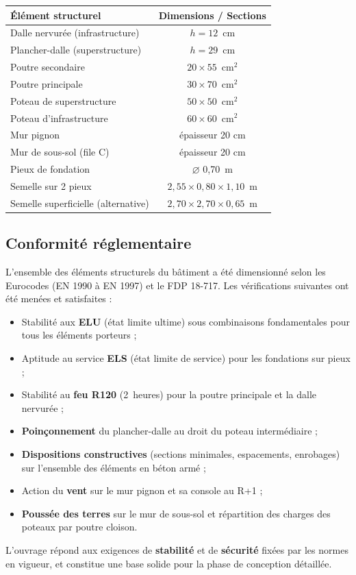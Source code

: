 \begin{tabularx}{\linewidth}{Xc}
\toprule
\textbf{Élément structurel} & \textbf{Dimensions / Sections} \\
\midrule
Dalle nervurée (infrastructure)             & $h = 12$~cm \\
Plancher-dalle (superstructure)             & $h = 29$~cm \\
Poutre secondaire                           & $20 \times 55$~cm$^{2}$ \\
Poutre principale                           & $30 \times 70$~cm$^{2}$ \\
Poteau de superstructure                    & $50 \times 50$~cm$^{2}$ \\
Poteau d'infrastructure                     & $60 \times 60$~cm$^{2}$ \\
Mur pignon                                  & épaisseur 20 cm \\
Mur de sous-sol (file C)                    & épaisseur 20 cm \\
Pieux de fondation                          & $\varnothing$ 0{,}70~m \\
Semelle sur 2 pieux                         & $2{,}55 \times 0{,}80 \times 1{,}10$~m \\
Semelle superficielle (alternative)         & $2{,}70 \times 2{,}70 \times 0{,}65$~m \\
\bottomrule
\end{tabularx}

\vspace{1cm}

\subsection*{Conformité réglementaire}

L'ensemble des éléments structurels du bâtiment a été dimensionné selon les Eurocodes (EN 1990 à EN 1997) et le FDP 18-717. Les vérifications suivantes ont été menées et satisfaites :

\begin{itemize}
  \item Stabilité aux \textbf{ELU} (état limite ultime) sous combinaisons fondamentales pour tous les éléments porteurs ;
  \item Aptitude au service \textbf{ELS} (état limite de service) pour les fondations sur pieux ;
  \item Stabilité au \textbf{feu R120} (2~heures) pour la poutre principale et la dalle nervurée ;
  \item \textbf{Poinçonnement} du plancher-dalle au droit du poteau intermédiaire ;
  \item \textbf{Dispositions constructives} (sections minimales, espacements, enrobages) sur l'ensemble des éléments en béton armé ;
  \item Action du \textbf{vent} sur le mur pignon et sa console au R+1 ;
  \item \textbf{Poussée des terres} sur le mur de sous-sol et répartition des charges des poteaux par poutre cloison.
\end{itemize}

L'ouvrage répond aux exigences de \textbf{stabilité} et de \textbf{sécurité} fixées par les normes en vigueur, et constitue une base solide pour la phase de conception détaillée.

